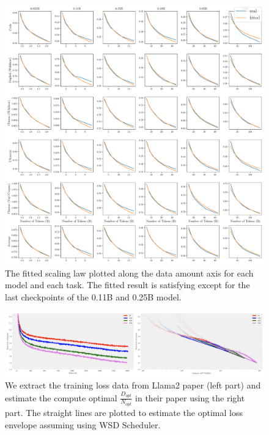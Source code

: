 \begin{figure}
    \centering
    \includegraphics[width=1.0\textwidth]{Fig/individual_task_datascalinglaw.pdf}
    \caption{The fitted scaling law plotted along the data amount axis for each model and each task. The fitted result is satisfying except for the last checkpoints of the 0.11B and 0.25B model. }
    \label{fig:individual_task_datascalinglaw}
\end{figure}


\begin{figure}
    \centering
    \includegraphics[width=1.0\textwidth]{Fig/llama2_scaling.pdf}
    \caption{We extract the training loss data from Llama2 paper (left part) and estimate the compute optimal $\frac{D_{opt}}{N_{opt}}$ in their paper using the right part. The straight lines are plotted to estimate the optimal loss envelope assuming using WSD Scheduler.}
    \label{fig:llamascaling}
\end{figure}




